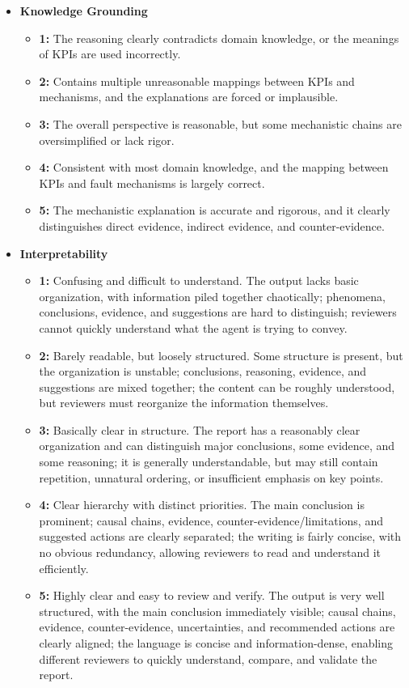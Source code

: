 \documentclass[sigconf,10pt]{acmart} %
\begin{document}
\begin{itemize}[itemsep=0em, topsep=0em, leftmargin=1em]
    \item \textbf{Knowledge Grounding}
    \begin{itemize}[itemsep=0em, topsep=0em, leftmargin=1em]
        \item \textbf{1:} The reasoning clearly contradicts domain knowledge, or the meanings of KPIs are used incorrectly.
        \item \textbf{2:} Contains multiple unreasonable mappings between KPIs and mechanisms, and the explanations are forced or implausible.
        \item \textbf{3:} The overall perspective is reasonable, but some mechanistic chains are oversimplified or lack rigor.
        \item \textbf{4:} Consistent with most domain knowledge, and the mapping between KPIs and fault mechanisms is largely correct.
        \item \textbf{5:} The mechanistic explanation is accurate and rigorous, and it clearly distinguishes direct evidence, indirect evidence, and counter-evidence.
    \end{itemize}

    \item \textbf{Interpretability}
    \begin{itemize}[itemsep=0em, topsep=0em, leftmargin=1em]
        \item \textbf{1:} Confusing and difficult to understand. The output lacks basic organization, with information piled together chaotically; phenomena, conclusions, evidence, and suggestions are hard to distinguish; reviewers cannot quickly understand what the agent is trying to convey.
        \item \textbf{2:} Barely readable, but loosely structured. Some structure is present, but the organization is unstable; conclusions, reasoning, evidence, and suggestions are mixed together; the content can be roughly understood, but reviewers must reorganize the information themselves.
        \item \textbf{3:} Basically clear in structure. The report has a reasonably clear organization and can distinguish major conclusions, some evidence, and some reasoning; it is generally understandable, but may still contain repetition, unnatural ordering, or insufficient emphasis on key points.
        \item \textbf{4:} Clear hierarchy with distinct priorities. The main conclusion is prominent; causal chains, evidence, counter-evidence/limitations, and suggested actions are clearly separated; the writing is fairly concise, with no obvious redundancy, allowing reviewers to read and understand it efficiently.
        \item \textbf{5:} Highly clear and easy to review and verify. The output is very well structured, with the main conclusion immediately visible; causal chains, evidence, counter-evidence, uncertainties, and recommended actions are clearly aligned; the language is concise and information-dense, enabling different reviewers to quickly understand, compare, and validate the report.
    \end{itemize}
\end{itemize}
\end{document}
